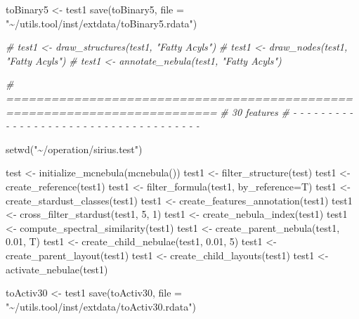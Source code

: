 \documentclass[
]{article}
\newenvironment{Shaded}{\begin{snugshade}}{\end{snugshade}}
\newcommand{\AttributeTok}[1]{\textcolor[rgb]{0.77,0.63,0.00}{#1}}
\newcommand{\CommentTok}[1]{\textcolor[rgb]{0.56,0.35,0.01}{\textit{#1}}}
\newcommand{\DecValTok}[1]{\textcolor[rgb]{0.00,0.00,0.81}{#1}}
\newcommand{\FloatTok}[1]{\textcolor[rgb]{0.00,0.00,0.81}{#1}}
\newcommand{\FunctionTok}[1]{\textcolor[rgb]{0.00,0.00,0.00}{#1}}
\newcommand{\NormalTok}[1]{#1}
\newcommand{\OtherTok}[1]{\textcolor[rgb]{0.56,0.35,0.01}{#1}}
\newcommand{\StringTok}[1]{\textcolor[rgb]{0.31,0.60,0.02}{#1}}
\begin{document}
\begin{Shaded}
\begin{Highlighting}[]
\NormalTok{toBinary5 }\OtherTok{\textless{}{-}}\NormalTok{ test1}
\FunctionTok{save}\NormalTok{(toBinary5, }\AttributeTok{file =} \StringTok{"\textasciitilde{}/utils.tool/inst/extdata/toBinary5.rdata"}\NormalTok{)}

\CommentTok{\# test1 \textless{}{-} draw\_structures(test1, "Fatty Acyls")}
\CommentTok{\# test1 \textless{}{-} draw\_nodes(test1, "Fatty Acyls")}
\CommentTok{\# test1 \textless{}{-} annotate\_nebula(test1, "Fatty Acyls")}
\end{Highlighting}
\end{Shaded}

\begin{Shaded}
\begin{Highlighting}[]
\CommentTok{\# ==========================================================================}
\CommentTok{\# 30 features}
\CommentTok{\# {-} {-} {-} {-} {-} {-} {-} {-} {-} {-} {-} {-} {-} {-} {-} {-} {-} {-} {-} {-} {-} {-} {-} {-} {-} {-} {-} {-} {-} {-} {-} {-} {-} {-} {-} {-} {-}}

\FunctionTok{setwd}\NormalTok{(}\StringTok{"\textasciitilde{}/operation/sirius.test"}\NormalTok{)}

\NormalTok{test }\OtherTok{\textless{}{-}} \FunctionTok{initialize\_mcnebula}\NormalTok{(}\FunctionTok{mcnebula}\NormalTok{())}
\NormalTok{test1 }\OtherTok{\textless{}{-}} \FunctionTok{filter\_structure}\NormalTok{(test)}
\NormalTok{test1 }\OtherTok{\textless{}{-}} \FunctionTok{create\_reference}\NormalTok{(test1)}
\NormalTok{test1 }\OtherTok{\textless{}{-}} \FunctionTok{filter\_formula}\NormalTok{(test1, }\AttributeTok{by\_reference=}\NormalTok{T)}
\NormalTok{test1 }\OtherTok{\textless{}{-}} \FunctionTok{create\_stardust\_classes}\NormalTok{(test1)}
\NormalTok{test1 }\OtherTok{\textless{}{-}} \FunctionTok{create\_features\_annotation}\NormalTok{(test1)}
\NormalTok{test1 }\OtherTok{\textless{}{-}} \FunctionTok{cross\_filter\_stardust}\NormalTok{(test1, }\DecValTok{5}\NormalTok{, }\DecValTok{1}\NormalTok{)}
\NormalTok{test1 }\OtherTok{\textless{}{-}} \FunctionTok{create\_nebula\_index}\NormalTok{(test1)}
\NormalTok{test1 }\OtherTok{\textless{}{-}} \FunctionTok{compute\_spectral\_similarity}\NormalTok{(test1)}
\NormalTok{test1 }\OtherTok{\textless{}{-}} \FunctionTok{create\_parent\_nebula}\NormalTok{(test1, }\FloatTok{0.01}\NormalTok{, T)}
\NormalTok{test1 }\OtherTok{\textless{}{-}} \FunctionTok{create\_child\_nebulae}\NormalTok{(test1, }\FloatTok{0.01}\NormalTok{, }\DecValTok{5}\NormalTok{)}
\NormalTok{test1 }\OtherTok{\textless{}{-}} \FunctionTok{create\_parent\_layout}\NormalTok{(test1)}
\NormalTok{test1 }\OtherTok{\textless{}{-}} \FunctionTok{create\_child\_layouts}\NormalTok{(test1)}
\NormalTok{test1 }\OtherTok{\textless{}{-}} \FunctionTok{activate\_nebulae}\NormalTok{(test1)}

\NormalTok{toActiv30 }\OtherTok{\textless{}{-}}\NormalTok{ test1}
\FunctionTok{save}\NormalTok{(toActiv30, }\AttributeTok{file =} \StringTok{"\textasciitilde{}/utils.tool/inst/extdata/toActiv30.rdata"}\NormalTok{)}
\end{Highlighting}
\end{Shaded}
\end{document}
